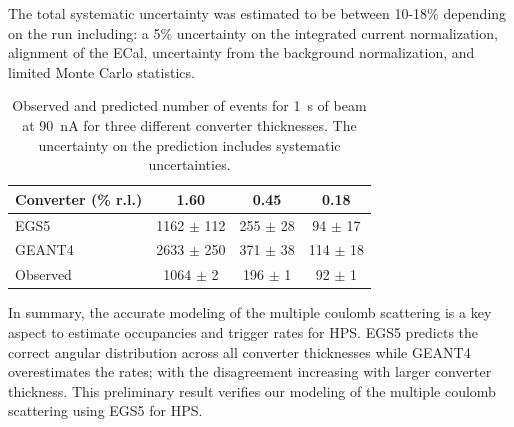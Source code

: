 The total systematic uncertainty was estimated to be between 10-18\% depending on the run including:  
a 5\% uncertainty on the integrated current normalization, 
alignment of the ECal, 
uncertainty from the background normalization, 
and limited Monte Carlo statistics.  
\begin{table}
\begin{tabular}{|l|c|c|c|}
\hline
Converter (\% r.l.) & 1.60 & 0.45 &	0.18 \\
\hline
EGS5 &	1162 $\pm$ 112 &	255 $\pm$ 28 &	94 $\pm$ 17	\\
\hline
GEANT4 & 2633 $\pm$ 250 & 	371 $\pm$ 38 &	114 $\pm$ 18 \\
\hline
Observed 	& 1064 $\pm$ 2 & 196 $\pm$ 1 &	92 $\pm$ 1 \\						
%						
\hline
\end{tabular}
\caption{ {\small Observed and predicted number of events for 1~s of beam at 90~nA for three different converter 
thicknesses. The uncertainty on the prediction includes systematic uncertainties. }}
\label{tab:ang_distr_dataMC}
\end{table}

In summary, the accurate modeling of the multiple coulomb scattering is a key aspect to estimate occupancies and trigger rates for HPS. EGS5 predicts the correct angular distribution across all converter thicknesses while GEANT4 overestimates the rates; with the disagreement increasing  with larger converter thickness. This preliminary result verifies our modeling of the multiple coulomb scattering using EGS5 for HPS.
